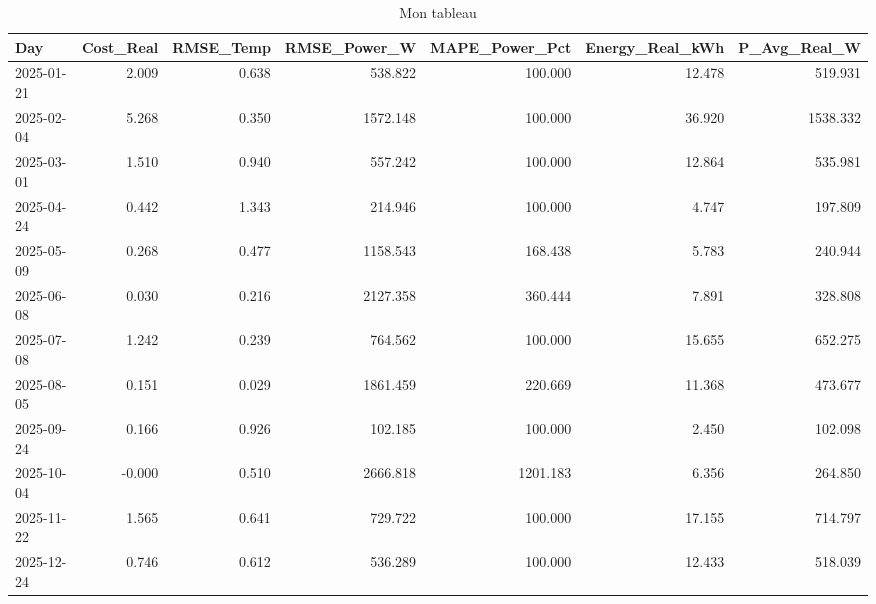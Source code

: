 \begin{table}
\caption{Mon tableau}
\label{tab:mon_tableau}
\begin{tabular}{lrrrrrr}
\toprule
Day & Cost_Real & RMSE_Temp & RMSE_Power_W & MAPE_Power_Pct & Energy_Real_kWh & P_Avg_Real_W \\
\midrule
2025-01-21 & 2.009 & 0.638 & 538.822 & 100.000 & 12.478 & 519.931 \\
2025-02-04 & 5.268 & 0.350 & 1572.148 & 100.000 & 36.920 & 1538.332 \\
2025-03-01 & 1.510 & 0.940 & 557.242 & 100.000 & 12.864 & 535.981 \\
2025-04-24 & 0.442 & 1.343 & 214.946 & 100.000 & 4.747 & 197.809 \\
2025-05-09 & 0.268 & 0.477 & 1158.543 & 168.438 & 5.783 & 240.944 \\
2025-06-08 & 0.030 & 0.216 & 2127.358 & 360.444 & 7.891 & 328.808 \\
2025-07-08 & 1.242 & 0.239 & 764.562 & 100.000 & 15.655 & 652.275 \\
2025-08-05 & 0.151 & 0.029 & 1861.459 & 220.669 & 11.368 & 473.677 \\
2025-09-24 & 0.166 & 0.926 & 102.185 & 100.000 & 2.450 & 102.098 \\
2025-10-04 & -0.000 & 0.510 & 2666.818 & 1201.183 & 6.356 & 264.850 \\
2025-11-22 & 1.565 & 0.641 & 729.722 & 100.000 & 17.155 & 714.797 \\
2025-12-24 & 0.746 & 0.612 & 536.289 & 100.000 & 12.433 & 518.039 \\
\bottomrule
\end{tabular}
\end{table}
